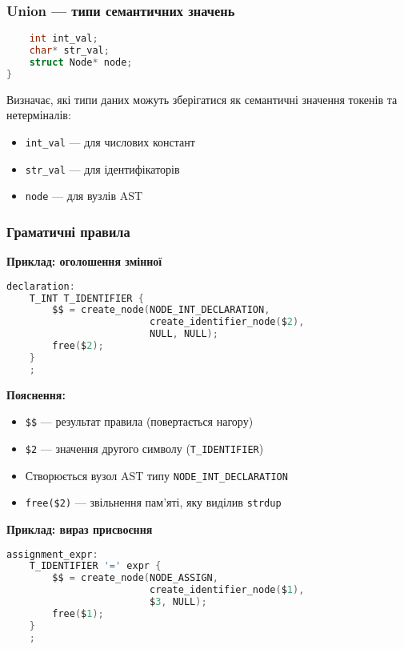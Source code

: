 \documentclass[12pt,a4paper]{article}
\begin{document}
\subsubsection{Union --- типи семантичних значень}

\begin{lstlisting}[language=C]
%union {
    int int_val;
    char* str_val;
    struct Node* node;
}
\end{lstlisting}

Визначає, які типи даних можуть зберігатися як семантичні значення токенів та нетерміналів:
\begin{itemize}
    \item \texttt{int\_val} --- для числових констант
    \item \texttt{str\_val} --- для ідентифікаторів
    \item \texttt{node} --- для вузлів AST
\end{itemize}

\subsubsection{Граматичні правила}

\textbf{Приклад: оголошення змінної}

\begin{lstlisting}[language=C]
declaration:
    T_INT T_IDENTIFIER { 
        $$ = create_node(NODE_INT_DECLARATION, 
                         create_identifier_node($2), 
                         NULL, NULL); 
        free($2); 
    }
    ;
\end{lstlisting}

\textbf{Пояснення:}
\begin{itemize}
    \item \texttt{\$\$} --- результат правила (повертається нагору)
    \item \texttt{\$2} --- значення другого символу (\texttt{T\_IDENTIFIER})
    \item Створюється вузол AST типу \texttt{NODE\_INT\_DECLARATION}
    \item \texttt{free(\$2)} --- звільнення пам'яті, яку виділив \texttt{strdup}
\end{itemize}

\textbf{Приклад: вираз присвоєння}

\begin{lstlisting}[language=C]
assignment_expr:
    T_IDENTIFIER '=' expr { 
        $$ = create_node(NODE_ASSIGN, 
                         create_identifier_node($1), 
                         $3, NULL); 
        free($1); 
    }
    ;
\end{lstlisting}
\end{document}
